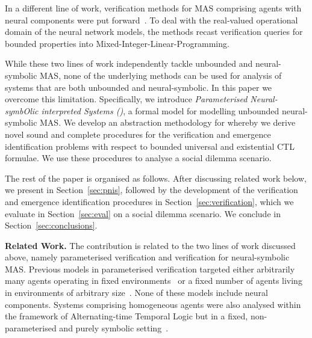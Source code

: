 In a different line of work, verification methods for MAS comprising agents
with neural components were put forward~\cite{Akintunde+20b,Akintunde+22}. To
deal with the real-valued operational domain of the neural network models, the
methods recast verification queries for bounded properties into
Mixed-Integer-Linear-Programming.

While these two lines of work independently tackle unbounded and neural-symbolic
MAS, none of the underlying methods can be used for analysis of systems that are
both unbounded and neural-symbolic.  In this paper we overcome this limitation.
Specifically, we introduce \emph{Parameterised
Neural-symbOlic interpreted Systems (\panos{})}, a
formal model
for modelling unbounded neural-symbolic MAS.  We develop an
abstraction methodology for \panos{} whereby we derive novel
sound and complete procedures for the verification and
emergence identification problems with respect to bounded
universal and existential CTL formulae.  We use these
procedures to analyse a social dilemma scenario.




The rest of the paper is organised as follows. After discussing related work
below, we present \panos{} in Section~\ref{sec:pnis}, followed by the development of
the verification and emergence identification procedures in
Section~\ref{sec:verification}, which we evaluate in Section~\ref{sec:eval}  on
a social dilemma scenario. We conclude in Section~\ref{sec:conclusions}.


{\bf Related Work.}  The contribution is related to the two
lines of work discussed above, namely parameterised
verification and verification for neural-symbolic MAS.
Previous models in parameterised verification targeted
either arbitrarily many agents operating in fixed
environments~\cite{KouvarosLomuscio16a,KouvarosLomuscio16c,FelliGianolaMontali20}
or a fixed number of agents living in environments of
arbitrary size~\cite{AminofMuranoRubin16}.  None of these
models include neural components.  Systems
comprising  homogeneous agents were also analysed within the
framework of Alternating-time Temporal Logic but in a fixed,
non-parameterised and purely symbolic setting~\cite{PedersenDyrkolbotn13}.

